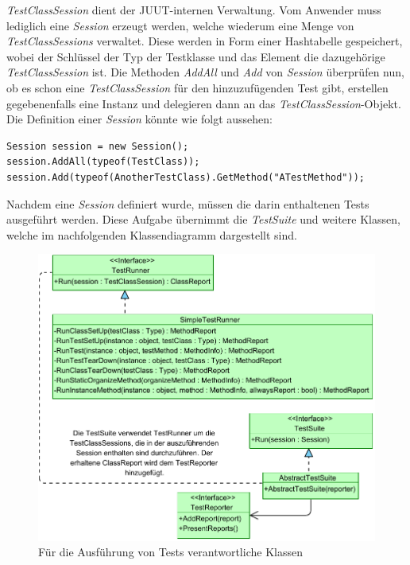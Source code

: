 \textit{TestClassSession} dient der JUUT-internen Verwaltung. Vom Anwender muss lediglich eine \textit{Session} erzeugt werden, welche wiederum eine Menge von \textit{TestClassSessions} verwaltet. Diese werden in Form einer Hashtabelle gespeichert, wobei der Schlüssel der Typ der Testklasse und das Element die dazugehörige \textit{TestClassSession} ist. Die Methoden \textit{AddAll} und \textit{Add} von \textit{Session} überprüfen nun, ob es schon eine \textit{TestClassSession} für den hinzuzufügenden Test gibt, erstellen gegebenenfalls eine Instanz und delegieren dann an das \textit{TestClassSession}-Objekt. Die Definition einer \textit{Session} könnte wie folgt aussehen:
\begin{lstlisting}[caption={[Beispiel für die Definition einer \textit{Session}]Beispiel für die Definition einer \textit{Session}}, label=code:Example_SessionCreation]
Session session = new Session();
session.AddAll(typeof(TestClass));
session.Add(typeof(AnotherTestClass).GetMethod("ATestMethod"));
\end{lstlisting}

Nachdem eine \textit{Session} definiert wurde, müssen die darin enthaltenen Tests ausgeführt werden. Diese Aufgabe übernimmt die \textit{TestSuite} und weitere Klassen, welche im nachfolgenden Klassendiagramm dargestellt sind.

\begin{figure}[h]
\centering
\includegraphics[width=0.8\linewidth]{images/Kapitel_Ergebnis/SuitesAndRunners}
\caption[Für die Ausführung von Tests verantwortliche Klassen]{Für die Ausführung von Tests verantwortliche Klassen}
\label{fig:SuitesAndRunners}
\end{figure}

